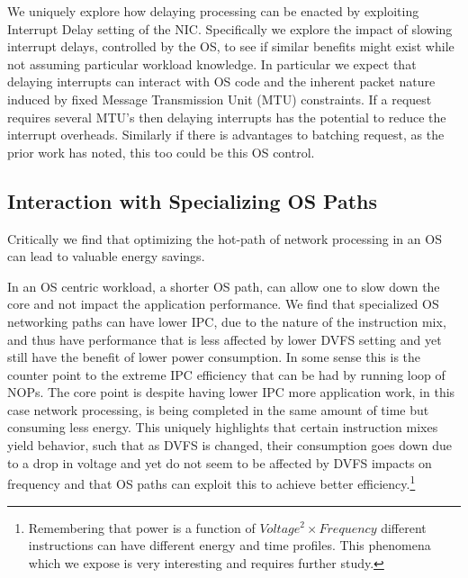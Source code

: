We uniquely explore how delaying processing can be enacted by exploiting Interrupt Delay setting of the NIC. Specifically we explore the impact of slowing interrupt delays, controlled by the OS, to see if similar benefits might exist while not assuming particular workload knowledge.  In particular we expect that delaying interrupts can interact with OS code and the inherent packet nature induced by fixed Message Transmission Unit (MTU) constraints. If a request requires several MTU's then delaying interrupts has the potential to reduce the interrupt overheads. Similarly if there is advantages to batching request, as the prior work has noted, this too could be this OS control.

\subsection{Interaction with Specializing OS Paths} 
 Critically we find that optimizing the hot-path of network processing in an OS can lead to valuable energy savings.  

In an OS centric workload, a shorter OS path, can allow one to slow down the core and not impact the application performance.  We find that specialized OS networking paths can have lower IPC, due to the nature of the instruction mix, and thus have performance that is less affected by lower DVFS setting and yet still have the benefit of lower power consumption.  In some sense this is the counter point to the extreme IPC efficiency that can be had by running loop of NOPs.    The core point is despite having lower IPC more application work, in this case network processing, is being completed in the same amount of time but consuming less energy.  This uniquely highlights that certain instruction mixes yield behavior, such that as DVFS is changed, their consumption goes down due to a drop in voltage and yet do not seem to be affected by DVFS impacts on frequency and that OS paths can exploit this to achieve better efficiency.\footnote{Remembering that power is a function of $Voltage^2 \times Frequency$ different instructions can have different energy and time profiles.  This phenomena which we expose is very interesting and requires further study.}

